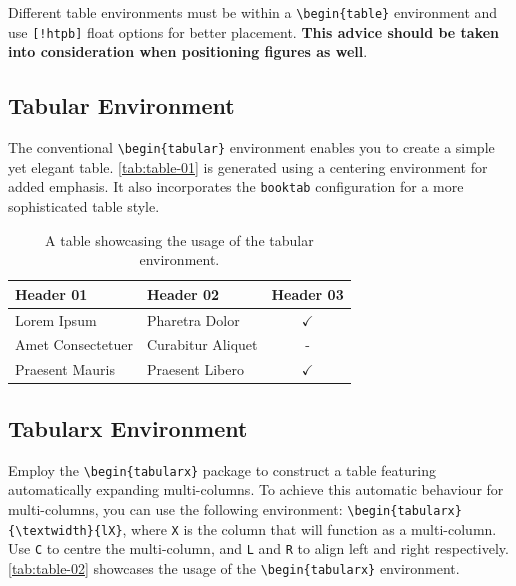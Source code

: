 \begin{block}[tip]
Different table environments must be within a \texttt{\textbackslash begin\{table\}} environment and use \texttt{[!htpb]} float options for better placement. \textbf{This advice should be taken into consideration when positioning figures as well}.
\end{block}

\subsection{Tabular Environment}
The conventional \verb|\begin{tabular}| environment enables you to create a simple yet elegant table. \autoref{tab:table-01} is generated using a centering environment for added emphasis. It also incorporates the \verb|booktab| configuration for a more sophisticated table style.

\begin{table}[!htpb]
    \caption{A table showcasing the usage of the tabular environment.}
    \label{tab:table-01}
    \centering
    \begin{tabular}{llc}
        \toprule
        \textbf{Header 01} & \textbf{Header 02} & \textbf{Header 03} \\ 
        \midrule
        Lorem Ipsum         & Pharetra Dolor    & $\checkmark$  \\
        Amet Consectetuer   & Curabitur Aliquet & -             \\
        Praesent Mauris     & Praesent Libero   & $\checkmark$  \\
        \bottomrule
    \end{tabular}
\end{table}

\subsection{Tabularx Environment}
Employ the \verb|\begin{tabularx}| package to construct a table featuring automatically expanding multi-columns. To achieve this automatic behaviour for multi-columns, you can use the following environment: \verb|\begin{tabularx}{\textwidth}{lX}|, where \verb|X| is the column that will function as a multi-column. Use \verb|C| to centre the multi-column, and \verb|L| and \verb|R| to align left and right respectively. \autoref{tab:table-02} showcases the usage of the \verb|\begin{tabularx}| environment.

